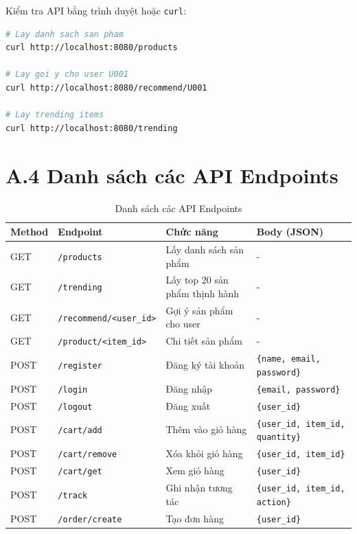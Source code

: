 \documentclass{report}
\begin{document}
Kiểm tra API bằng trình duyệt hoặc \texttt{curl}:
\begin{lstlisting}[language=bash, style=cppstyle, caption={Ví dụ gọi API}]
# Lay danh sach san pham
curl http://localhost:8080/products

# Lay goi y cho user U001
curl http://localhost:8080/recommend/U001

# Lay trending items
curl http://localhost:8080/trending
\end{lstlisting}

\section*{A.4 Danh sách các API Endpoints}

\begin{table}[H]
    \centering
    \renewcommand{\arraystretch}{1.5}
    \begin{tabularx}{\textwidth}{|l|l|>{\raggedright\arraybackslash}X|>{\raggedright\arraybackslash}X|}
        \hline
        \textbf{Method} & \textbf{Endpoint} & \textbf{Chức năng} & \textbf{Body (JSON)} \\ \hline
        GET & \texttt{/products} & Lấy danh sách sản phẩm & - \\ \hline
        GET & \texttt{/trending} & Lấy top 20 sản phẩm thịnh hành & - \\ \hline
        GET & \texttt{/recommend/<user\_id>} & Gợi ý sản phẩm cho user & - \\ \hline
        GET & \texttt{/product/<item\_id>} & Chi tiết sản phẩm & - \\ \hline
        POST & \texttt{/register} & Đăng ký tài khoản & \texttt{\{name, email, password\}} \\ \hline
        POST & \texttt{/login} & Đăng nhập & \texttt{\{email, password\}} \\ \hline
        POST & \texttt{/logout} & Đăng xuất & \texttt{\{user\_id\}} \\ \hline
        POST & \texttt{/cart/add} & Thêm vào giỏ hàng & \texttt{\{user\_id, item\_id, quantity\}} \\ \hline
        POST & \texttt{/cart/remove} & Xóa khỏi giỏ hàng & \texttt{\{user\_id, item\_id\}} \\ \hline
        POST & \texttt{/cart/get} & Xem giỏ hàng & \texttt{\{user\_id\}} \\ \hline
        POST & \texttt{/track} & Ghi nhận tương tác & \texttt{\{user\_id, item\_id, action\}} \\ \hline
        POST & \texttt{/order/create} & Tạo đơn hàng & \texttt{\{user\_id\}} \\ \hline
    \end{tabularx}
    \caption{Danh sách các API Endpoints}
    \label{tab:api_endpoints}
\end{table}
\end{document}
